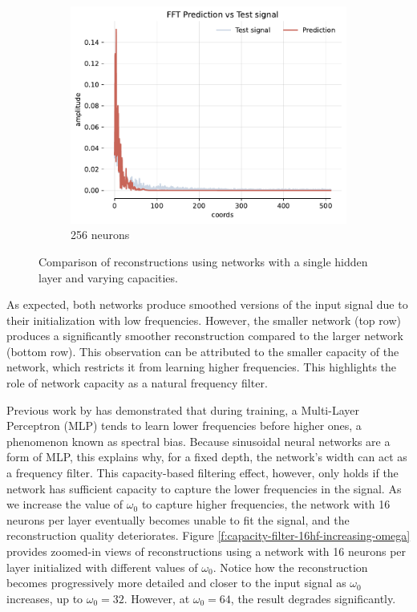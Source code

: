 \begin{figure}[h]
\begin{subfigure}[b]{0.32\textwidth}
        \centering
        \includegraphics[width=\textwidth]{img/ch3/fft-1hl-256hf-2hz.pdf}
        \caption{256 neurons}
        \label{fig:fft-1hl-256hf-2hz}
    \end{subfigure}
    \caption{Comparison of reconstructions using networks with a single hidden layer and varying capacities.}
    \label{f:capacity-filter-16-hf-256}
\end{figure}

As expected, both networks produce smoothed versions of the input signal due to their initialization with low frequencies. However, the smaller network (top row) produces a significantly smoother reconstruction compared to the larger network (bottom row). This observation can be attributed to the smaller capacity of the network, which restricts it from learning higher frequencies. This highlights the role of network capacity as a natural frequency filter.

Previous work by \cite{Rahaman2018O} has demonstrated that during training, a Multi-Layer Perceptron (MLP) tends to learn lower frequencies before higher ones, a phenomenon known as spectral bias. Because sinusoidal neural networks are a form of MLP, this explains why, for a fixed depth, the network's width can act as a frequency filter. This capacity-based filtering effect, however, only holds if the network has sufficient capacity to capture the lower frequencies in the signal. As we increase the value of $\omega_0$ to capture higher frequencies, the network with 16 neurons per layer eventually becomes unable to fit the signal, and the reconstruction quality deteriorates. Figure \ref{f:capacity-filter-16hf-increasing-omega} provides zoomed-in views of reconstructions using a network with 16 neurons per layer initialized with different values of $\omega_0$. Notice how the reconstruction becomes progressively more detailed and closer to the input signal as $\omega_0$ increases, up to $\omega_0 = 32$. However, at $\omega_0=64$, the result degrades significantly.

